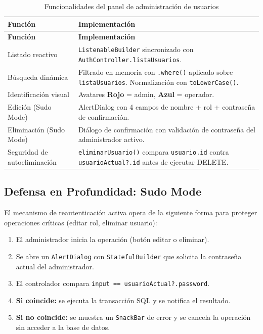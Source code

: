 \documentclass[12pt,a4paper]{article}
\begin{document}
\begin{longtable}{p{4cm} p{9.5cm}}
\caption{Funcionalidades del panel de administración de usuarios} \label{tab:crud-admin} \\
\toprule
\textbf{Función} & \textbf{Implementación} \\
\midrule
\endfirsthead
\toprule
\textbf{Función} & \textbf{Implementación} \\
\midrule
\endhead
\bottomrule
\endlastfoot
Listado reactivo & \texttt{ListenableBuilder} sincronizado con \texttt{AuthController.listaUsuarios}. \\[0.3em]
Búsqueda dinámica & Filtrado en memoria con \texttt{.where()} aplicado sobre \texttt{listaUsuarios}. Normalización con \texttt{toLowerCase()}. \\[0.3em]
Identificación visual & Avatares \textcolor{criticalred}{\textbf{Rojo}} = admin, \textcolor{primaryblue}{\textbf{Azul}} = operador. \\[0.3em]
Edición (Sudo Mode) & AlertDialog con 4 campos de nombre + rol + contraseña de confirmación. \\[0.3em]
Eliminación (Sudo Mode) & Diálogo de confirmación con validación de contraseña del administrador activo. \\[0.3em]
Seguridad de autoeliminación & \texttt{eliminarUsuario()} compara \texttt{usuario.id} contra \texttt{usuarioActual?.id} antes de ejecutar DELETE. \\
\end{longtable}

\subsection{Defensa en Profundidad: Sudo Mode}

El mecanismo de reautenticación activa opera de la siguiente forma para proteger operaciones
críticas (editar rol, eliminar usuario):

\begin{enumerate}[leftmargin=2em]
  \item El administrador inicia la operación (botón editar o eliminar).
  \item Se abre un \texttt{AlertDialog} con \texttt{StatefulBuilder} que solicita la
        contraseña actual del administrador.
  \item El controlador compara \texttt{input == usuarioActual?.password}.
  \item \textbf{Si coincide:} se ejecuta la transacción SQL y se notifica el resultado.
  \item \textbf{Si no coincide:} se muestra un \texttt{SnackBar} de error y se cancela
        la operación sin acceder a la base de datos.
\end{enumerate}
\end{document}
